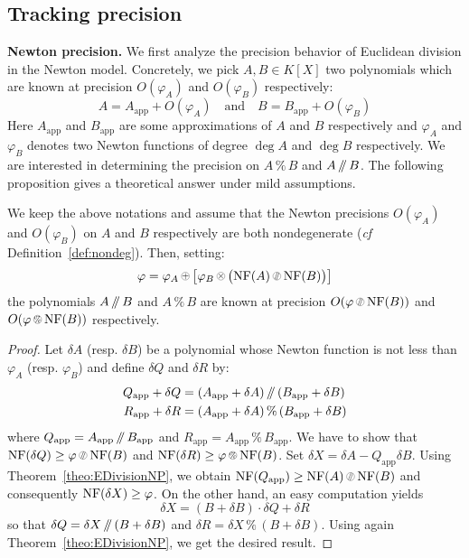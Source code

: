 \documentclass{sig-alternate-2013}
\newcommand{\NF}{\text{\rm NF}}
\renewcommand{\mod}{\,\%\,}
\renewcommand{\div}{\,/\hspace{-0.3em}/\,}
\newcommand{\nfop}[1]{%
\raisebox{-0.1mm}{\begin{tikzpicture}
\draw[transparent] (-0.18,0)--(0.18,0);
\draw[very thin] (0,0) circle (0.11cm);
\begin{scope}
\clip (0,0) circle (0.11cm);
\node[scale=0.75] at (0,0) { $#1$ };
\end{scope}
\end{tikzpicture}}}
\newcommand{\nfplus}{\nfop+}
\newcommand{\nftimes}{\nfop\times}
\newcommand{\nfmod}{\nfop\mod}
\newcommand{\nfdiv}{\nfop\div}
\newcommand{\app}{\textrm{app}}
\begin{document}
\subsection{Tracking precision} \label{sec:prec_track}

\medskip

\noindent
{\bf Newton precision.}
We first analyze the precision behavior of Euclidean division
in the Newton model.  Concretely, we pick $A, B \in K[X]$ two polynomials which 
are known at precision $O(\varphi_A)$ and $O(\varphi_B)$ respectively:
$$A = A_\app + O(\varphi_A)
\quad \text{and} \quad
B = B_\app + O(\varphi_B)$$
Here $A_\app$ and $B_\app$ are some approximations of $A$ and $B$ respectively 
and $\varphi_A$ and $\varphi_B$ denotes two Newton functions of degree 
$\deg A$ and $\deg B$ respectively.
We are interested in determining the precision on $A \mod B$ and $A
\div B$. The following proposition gives a theoretical answer under
mild assumptions.

\begin{prop}
\label{prop:NewtonprecEuclide}
We keep the above notations and assume that the Newton precisions
$O(\varphi_A)$ and $O(\varphi_B)$ on $A$ and $B$ respectively are 
both nondegenerate (\emph{cf} Definition~\ref{def:nondeg}). Then,
setting:
$$\varphi = \varphi_A \nfplus 
\big[ \varphi_B \nftimes \big(\NF(A) \nfdiv \NF(B)\big) \big]$$
the polynomials $A \div B$ and $A \mod B$ are known at precision 
$O(\varphi \nfdiv \NF(B))$ and $O(\varphi \nfmod \NF(B))$ respectively.
\end{prop}

\begin{proof}
Let $\delta A$ (resp. $\delta B$) be a polynomial whose Newton 
function is not less than $\varphi_A$ (resp. $\varphi_B$) and define
$\delta Q$ and $\delta R$ by:
\begin{align*}
Q_\app + \delta Q & = (A_\app + \delta A) \div (B_\app + \delta B) \\
R_\app + \delta R & = (A_\app + \delta A) \mod (B_\app + \delta B)
\end{align*}
where $Q_\app = A_\app \div B_\app$ and $R_\app = A_\app \mod B_\app$.
We have to show that $\NF(\delta Q) \geq \varphi \nfdiv \NF(B)$ and
$\NF(\delta R) \geq \varphi \nfmod \NF(B)$.
Set $\delta X = \delta A - Q_\app \delta B$. 
Using Theorem~\ref{theo:EDivisionNP}, we obtain $\NF(Q_\app) \geq
\NF(A) \nfdiv \NF(B)$ and consequently $\NF(\delta X) \geq \varphi$.
On the other hand, an easy computation yields
$$\delta X = (B + \delta B) \cdot \delta Q + \delta R$$
so that $\delta Q = \delta X \div (B + \delta B)$ and 
$\delta R = \delta X \mod (B + \delta B)$. Using again 
Theorem~\ref{theo:EDivisionNP}, we get the desired result.
\end{proof}
\end{document}
